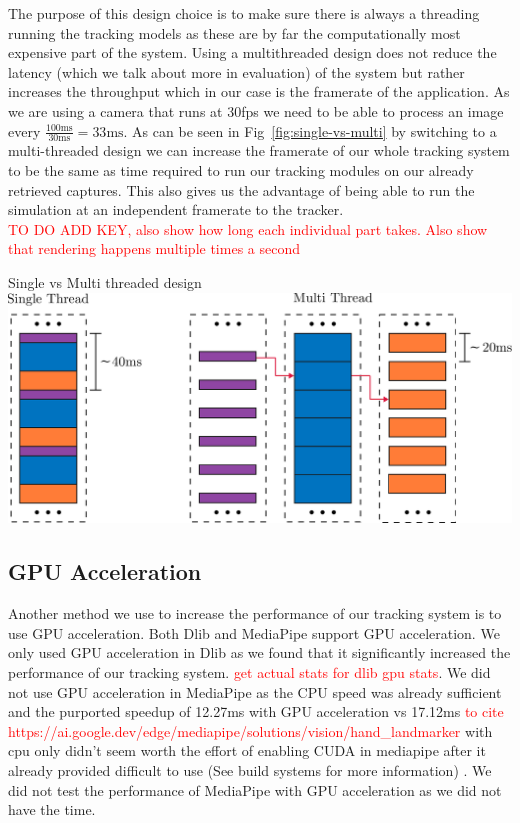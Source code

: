 The purpose of this design choice is to make sure there is always a threading running the tracking models as these are by far the computationally most expensive part of the system. Using a multithreaded design does not reduce the latency (which we talk about more in evaluation) of the system but rather increases the throughput which in our case is the framerate of the application. As we are using a camera that runs at 30fps we need to be able to process an image every $\frac{100\text{ms}}{30\text{ms}} = 33 \text{ms} $. As can be seen in Fig~\ref{fig:single-vs-multi} by switching to a multi-threaded design we can increase the framerate of our whole tracking system to be the same as time required to run our tracking modules on our already retrieved captures. This also gives us the advantage of being able to run the simulation at an independent framerate to the tracker. \\

\textcolor{red}{TO DO ADD KEY, also show how long each individual part takes. Also show that rendering happens multiple times a second}
\begin{figureBox}[label={fig:single-vs-multi}, width=0.8\linewidth]{Single vs Multi threaded design}
    \includegraphics[width = 0.8\linewidth]{./implementation/figures/single-vs-multi.pdf}
\end{figureBox}


\subsection{GPU Acceleration}

Another method we use to increase the performance of our tracking system is to use GPU acceleration. Both Dlib and MediaPipe support GPU acceleration. We only used GPU acceleration in Dlib as we found that it significantly increased the performance of our tracking system. \textcolor{red}{get actual stats for dlib gpu stats}. We did not use GPU acceleration in MediaPipe as the CPU speed was already sufficient and the purported speedup of 12.27ms with GPU acceleration vs 17.12ms \textcolor{red}{to cite https://ai.google.dev/edge/mediapipe/solutions/vision/hand\_landmarker} with cpu only didn't seem worth the effort of enabling CUDA in mediapipe after it already provided difficult to use (See build systems for more information) . We did not test the performance of MediaPipe with GPU acceleration as we did not have the time.  \\

